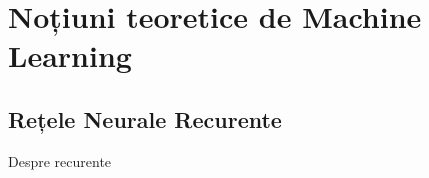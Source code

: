 \chapter{Noțiuni teoretice de Machine Learning}

\section{Rețele Neurale Recurente}

Despre recurente